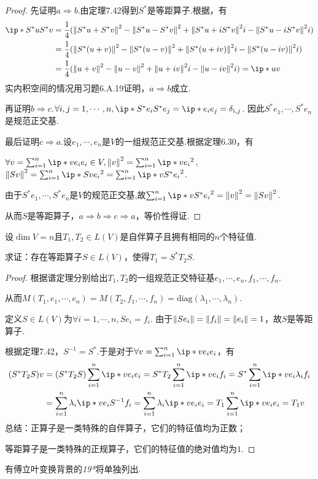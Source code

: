 \begin{proof}
    先证明\(a \Rightarrow b\).由定理7.42得到\(S^*\)是等距算子.根据，有
    \begin{align*}
        \ip*{S^*u}{S^*v}&=\dfrac{1}{4}(\norm*{S^*u+S^*v}^2-\norm*{S^*u-S^*v}^2+\norm*{S^*u+iS^*v}^2i-\norm*{S^*u-iS^*v}^2i) \\
        &=\dfrac{1}{4}(\norm*{S^*(u+v)}^2-\norm*{S^*(u-v)}^2+\norm*{S^*(u+iv)}^2i-\norm*{S^*(u-iv)}^2i) \\
        &=\dfrac{1}{4}(\norm*{u+v}^2-\norm*{u-v}^2+\norm*{u+iv}^2i-\norm*{u-iv}^2i)=\ip*{u}{v}
    \end{align*}
    实内积空间的情况用习题6.A.19证明，\(a \Rightarrow b\)成立.%

    再证明\(b \Rightarrow c\).\(\forall i,j=1,\cdots,n,\ip*{S^*e_i}{S^*e_j}=\ip*{e_i}{e_j}=\delta_{i,j}\).
    因此\(S^*e_1,\cdots,S^*e_n\)是规范正交基.

    最后证明\(c \Rightarrow a\).设\(e_1,\cdots,e_n\)是\(V\)的一组规范正交基.根据定理6.30，有

    \(\forall v=\sum_{i=1}^n \ip*{v}{e_i}e_i \in V,\norm*{v}^2=\sum_{i=1}^n \ip*{v}{e_i}^2\),
    \(\norm*{Sv}^2=\sum_{i=1}^n \ip*{Sv}{e_i}^2=\sum_{i=1}^n \ip*{v}{S^*e_i}^2\).

    由于\(S^*e_1,\cdots,S^*e_n\)是\(V\)的规范正交基,故\(\sum_{i=1}^n \ip*{v}{S^*e_i}^2=\norm*{v}^2=\norm*{Sv}^2\).

    从而\(S\)是等距算子，\(a \Rightarrow b \Rightarrow c \Rightarrow a\)，等价性得证.
\end{proof}

\begin{problem}[11]\label{7.C.11}
    设\(\dim V=n\)且\(T_1,T_2 \in L(V)\)是自伴算子且拥有相同的\(n\)个特征值.

    求证：存在等距算子\(S \in L(V)\)，使得\(T_1=S^*T_2S\).
\end{problem}

\begin{proof}
    根据谱定理分别给出\(T_1,T_2\)的一组规范正交特征基\(e_1,\cdots,e_n,f_1,\cdots,f_n\).

    从而\(M(T_1,e_1,\cdots,e_n)=M(T_2,f_1,\cdots,f_n)=\mathrm{diag}(\lambda_1,\cdots,\lambda_n)\).
    
    定义\(S \in L(V)\)为\(\forall i=1,\cdots,n,Se_i=f_i\).
    由于\(\norm*{Se_i}=\norm*{f_i}=\norm*{e_i}=1\)，故\(S\)是等距算子.
    
    根据定理7.42，\(S^{-1}=S^*\).于是对于\(\forall v=\sum_{i=1}^n \ip*{v}{e_i}e_i\)，有
    \begin{align*}
        (S^*T_2S)v&=(S^*T_2S)\sum_{i=1}^n \ip*{v}{e_i}e_i=S^*T_2\sum_{i=1}^n \ip*{v}{e_i}f_i
        =S^*\sum_{i=1}^n \ip*{v}{e_i}\lambda_if_i \\
        &=\sum_{i=1}^n \lambda_i\ip*{v}{e_i}S^{-1}f_i
        =\sum_{i=1}^n \lambda_i\ip*{v}{e_i}e_i=T_1\sum_{i=1}^n \ip*{v}{e_i}e_i=T_1v
    \end{align*}
    总结：正算子是一类特殊的自伴算子，它们的特征值均为正数；

    等距算子是一类特殊的正规算子，它们的特征值的绝对值均为\(1\).
\end{proof}

{\kaishu 有傅立叶变换背景的\textit{19*}将单独列出.}

